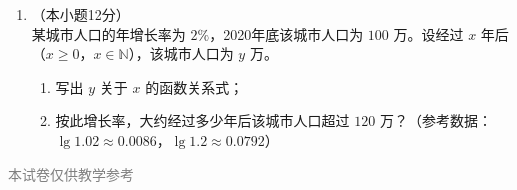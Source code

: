 \documentclass[12pt, a4paper]{ctexart}
\begin{document}
\begin{enumerate}[resume]
\vspace{7cm}

\item[22.]（本小题12分）\\
某城市人口的年增长率为 $2\%$，2020年底该城市人口为 $100$ 万。设经过 $x$ 年后（$x\geq 0$，$x\in\mathbb{N}$），该城市人口为 $y$ 万。
\begin{enumerate}[(1)]
  \item 写出 $y$ 关于 $x$ 的函数关系式；
  \item 按此增长率，大约经过多少年后该城市人口超过 $120$ 万？（参考数据：$\lg 1.02\approx 0.0086$，$\lg 1.2\approx 0.0792$）
\end{enumerate}

\vspace{7cm}
\end{enumerate}

\vfill
\begin{center}
\small\textcolor{gray}{本试卷仅供教学参考}
\end{center}
\end{document}
